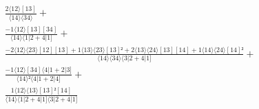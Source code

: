 \documentclass[varwidth, border=5pt]{standalone}
\begin{document}
\begin{my}
$\begin{gathered}
\scriptscriptstyle\frac{2⟨12⟩[13]}{⟨14⟩⟨34⟩} +\\
\scriptscriptstyle\frac{-1⟨12⟩[13][34]}{⟨14⟩⟨1|2+4|1]} +\\
\scriptscriptstyle\frac{-2⟨12⟩⟨23⟩[12][13]+1⟨13⟩⟨23⟩[13]²+2⟨13⟩⟨24⟩[13][14]+1⟨14⟩⟨24⟩[14]²}{⟨14⟩⟨34⟩⟨3|2+4|1]} +\\
\scriptscriptstyle\frac{-1⟨12⟩[34]⟨4|1+2|3]}{⟨14⟩²⟨4|1+2|4]} +\\
\scriptscriptstyle\frac{1⟨12⟩⟨13⟩[13]²[14]}{⟨14⟩⟨1|2+4|1]⟨3|2+4|1]} \phantom{+}
\end{gathered}$
\end{my}
\end{document}
